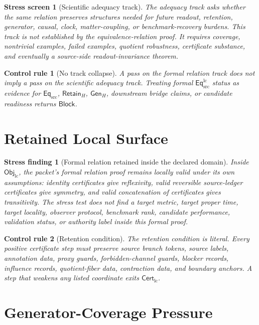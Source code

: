 \documentclass[11pt]{article}
\newcommand{\EqSrc}{\mathsf{Eq}_{\mathrm{src}}}
\newcommand{\EqLC}{\mathsf{Eq}_{\mathrm{src}}^{\mathrm{lc}}}
\newcommand{\ObjLC}{\mathsf{Obj}_{\mathrm{lc}}}
\newcommand{\CertLC}{\mathsf{Cert}_{\mathrm{lc}}}
\newcommand{\RetainH}{\mathsf{Retain}_{H}}
\newcommand{\GenH}{\mathsf{Gen}_{H}}
\newcommand{\Block}{\mathsf{Block}}
\newtheorem{stressscreen}{Stress screen}
\newtheorem{stressfinding}{Stress finding}
\newtheorem{controlrule}{Control rule}
\begin{document}
\begin{stressscreen}[Scientific adequacy track]
The adequacy track asks whether the same relation preserves structures
needed for future readout, retention, generator, causal, clock,
matter-coupling, or benchmark-recovery burdens. This track is not
established by the equivalence-relation proof. It requires coverage,
nontrivial examples, failed examples, quotient robustness, certificate
substance, and eventually a source-side readout-invariance theorem.
\end{stressscreen}

\begin{controlrule}[No track collapse]
A pass on the formal relation track does not imply a pass on the
scientific adequacy track. Treating formal \(\EqLC\) status as evidence
for \(\EqSrc\), \(\RetainH\), \(\GenH\), downstream bridge claims, or
candidate readiness returns \(\Block\).
\end{controlrule}

\section{Retained Local Surface}

\begin{stressfinding}[Formal relation retained inside the declared domain]
Inside \(\ObjLC\), the packet's formal relation proof remains locally
valid under its own assumptions: identity certificates give reflexivity,
valid reversible source-ledger certificates give symmetry, and valid
concatenation of certificates gives transitivity. The stress test does
not find a target metric, target proper time, target locality, observer
protocol, benchmark rank, candidate performance, validation status, or
authority label inside this formal proof.
\end{stressfinding}

\begin{controlrule}[Retention condition]
The retention condition is literal. Every positive certificate step must
preserve source branch tokens, source labels, annotation data, proxy
guards, forbidden-channel guards, blocker records, influence records,
quotient-fiber data, contraction data, and boundary anchors. A step that
weakens any listed coordinate exits \(\CertLC\).
\end{controlrule}

\section{Generator-Coverage Pressure}
\end{document}
